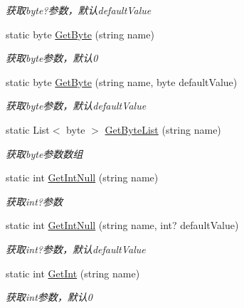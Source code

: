 \begin{DoxyCompactItemize}
\begin{DoxyCompactList}\small\item\em 获取byte?参数，默认default\+Value \end{DoxyCompactList}\item 
static byte \hyperlink{class_x_c_l_net_tools_1_1_string_hander_1_1_form_helper_aac299eb0719beba6c618deeed497fd76}{Get\+Byte} (string name)
\begin{DoxyCompactList}\small\item\em 获取byte参数，默认0 \end{DoxyCompactList}\item 
static byte \hyperlink{class_x_c_l_net_tools_1_1_string_hander_1_1_form_helper_aa1090c02b273fe23de21755a7b574a08}{Get\+Byte} (string name, byte default\+Value)
\begin{DoxyCompactList}\small\item\em 获取byte参数，默认default\+Value \end{DoxyCompactList}\item 
static List$<$ byte $>$ \hyperlink{class_x_c_l_net_tools_1_1_string_hander_1_1_form_helper_a575a372579f530e8fa7bce9a7808cf7f}{Get\+Byte\+List} (string name)
\begin{DoxyCompactList}\small\item\em 获取byte参数数组 \end{DoxyCompactList}\item 
static int \hyperlink{class_x_c_l_net_tools_1_1_string_hander_1_1_form_helper_a5f6d473bbc50e60cbd6c5015c1d4b010}{Get\+Int\+Null} (string name)
\begin{DoxyCompactList}\small\item\em 获取int?参数 \end{DoxyCompactList}\item 
static int \hyperlink{class_x_c_l_net_tools_1_1_string_hander_1_1_form_helper_a1516a7e8b32f2192c49bd2d2f754e11e}{Get\+Int\+Null} (string name, int? default\+Value)
\begin{DoxyCompactList}\small\item\em 获取int?参数，默认default\+Value \end{DoxyCompactList}\item 
static int \hyperlink{class_x_c_l_net_tools_1_1_string_hander_1_1_form_helper_ad3bcc9178dfa1bdc2d0e459b95d56fb4}{Get\+Int} (string name)
\begin{DoxyCompactList}\small\item\em 获取int参数，默认0 \end{DoxyCompactList}\item 

\end{DoxyCompactItemize}
